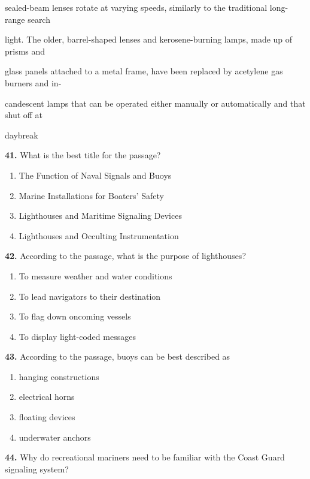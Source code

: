 \documentclass[12pt]{article}
\begin{document}
sealed-beam lenses rotate at varying speeds, similarly to the traditional long-range search\par
light. The older, barrel-shaped lenses and kerosene-burning lamps, made up of prisms and\par
glass panels attached to a metal frame, have been replaced by acetylene gas burners and in-\par
candescent lamps that can be operated either manually or automatically and that shut off at\par
daybreak\par
\endgroup
\medskip
\noindent\textbf{41.} What is the best title for the passage?
\begin{enumerate}[label=(\Alph*),leftmargin=*,itemsep=0.2em]
\item The Function of Naval Signals and Buoys
\item Marine Installations for Boaters' Safety
\item Lighthouses and Maritime Signaling Devices
\item Lighthouses and Occulting Instrumentation
\end{enumerate}
\par
\vspace{0.25\baselineskip}
\noindent\textbf{42.} According to the passage, what is the purpose of lighthouses?
\begin{enumerate}[label=(\Alph*),leftmargin=*,itemsep=0.2em]
\item To measure weather and water conditions
\item To lead navigators to their destination
\item To flag down oncoming vessels
\item To display light-coded messages
\end{enumerate}
\par
\vspace{0.25\baselineskip}
\noindent\textbf{43.} According to the passage, buoys can be best described as
\begin{enumerate}[label=(\Alph*),leftmargin=*,itemsep=0.2em]
\item hanging constructions
\item electrical horns
\item floating devices
\item underwater anchors
\end{enumerate}
\par
\vspace{0.25\baselineskip}
\noindent\textbf{44.} Why do recreational mariners need to be familiar with the Coast Guard signaling system?
\end{document}
